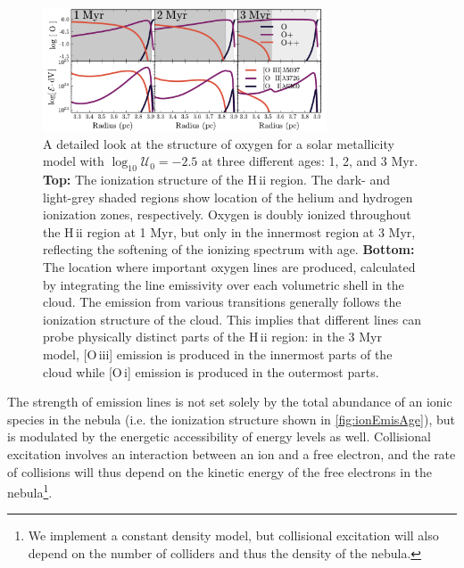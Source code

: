 \documentclass[linenumbers, tighten, trackchanges]{aastex61}%
\newcommand{\Fig}[1]{\autoref{fig:#1}}
\newcommand{\logten}{\ensuremath{\log_{10}}}
\newcommand{\oiii}{[O\,{\sc iii}]\xspace}
\newcommand{\oi}{[O\,{\sc i}]\xspace}
\newcommand{\hii}{H\,{\sc ii}\xspace}
\newcommand{\logU}{\ensuremath{\logten \mathcal{U}_0}}
\begin{document}
\begin{figure}[!htbp]
  \begin{centering}
    \includegraphics[width=0.75\textwidth]{f7.pdf}
    \caption{A detailed look at the structure of oxygen for a solar metallicity model with $\logU = -2.5$ at three different ages: 1, 2, and 3 Myr. \textbf{Top:} The ionization structure of the \hii region. The dark- and light-grey shaded regions show location of the helium and hydrogen ionization zones, respectively. Oxygen is doubly ionized throughout the \hii region at 1 Myr, but only in the innermost region at 3 Myr, reflecting the softening of the ionizing spectrum with age. \textbf{Bottom:} The location where important oxygen lines are produced, calculated by integrating the line emissivity over each volumetric shell in the cloud. The emission from various transitions generally follows the ionization structure of the cloud. This implies that different lines can probe physically distinct parts of the \hii region: in the 3 Myr model, \oiii{} emission is produced in the innermost parts of the cloud while \oi{} emission is produced in the outermost parts.}
    \label{fig:ionEmisAge}
  \end{centering}
\end{figure}

The strength of emission lines is not set solely by the total abundance of an ionic species in the nebula (i.e. the ionization structure shown in \Fig{ionEmisAge}), but is modulated by the energetic accessibility of energy levels as well. Collisional excitation involves an interaction between an ion and a free electron, and the rate of collisions will thus depend on the kinetic energy of the free electrons in the nebula\footnote{We implement a constant density model, but collisional excitation will also depend on the number of colliders and thus the density of the nebula.}.
\end{document}
